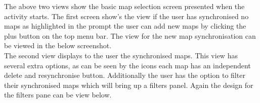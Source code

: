 \begin{center}
\end{center}

The above two views show the basic map selection screen presented when the activity starts. The first screen show's the view if the user has synchronised no maps as highlighted in the prompt the user can add new maps by clicking the plus button on the top menu bar. The view for the new map synchronisation can be viewed in the below screenshot.\\

The second view displays to the user the synchronised maps. This view has several extra options, as can be seen by the icons each map has an independent delete and resynchronise button. Additionally the user has the option to filter their synchronised maps which will bring up a filters panel. Again the design for the filters pane can be view below.

